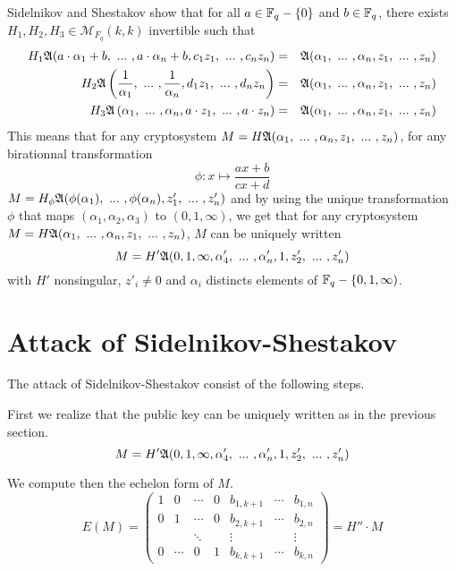 \documentclass[12pt,a4paper,titlepage]{article}
\begin{document}
Sidelnikov and Shestakov show \cite{SidelShes92} that for all $a \in \mathbb{F}_q-\{0\}$ and $b \in \mathbb{F}_q$, there exists $H_1, H_2, H_3 \in \mathcal{M}_{F_q}(k,k)$ invertible such that
\begin{eqnarray*}
H_1 \A(a\cdot\alpha_1 + b, \ ... \ , a\cdot \alpha_n + b, c_1z_1, \ ... \ , c_n z_n) &=& \A(\alpha_1, \ ... \ , \alpha_n, z_1, \ ... \ , z_n) \\
H_2 \A\left( \frac{1}{\alpha_1}, \ ... \ , \frac{1}{\alpha_n}, d_1z_1, \ ... \ , d_n z_n \right) &=& \A(\alpha_1, \ ... \ , \alpha_n, z_1, \ ... \ , z_n) \\
H_3 \A\left( \alpha_1, \ ... \ , \alpha_n, a\cdot z_1, \ ... \ , a\cdot z_n \right) &=& \A(\alpha_1, \ ... \ , \alpha_n, z_1, \ ... \ , z_n)
\end{eqnarray*}
This means that for any cryptosystem $M = H \A(\alpha_1, \ ... \ , \alpha_n, z_1, \ ... \ , z_n)$, for any birationnal transformation
$$ \phi : x \mapsto \frac{ax+b}{cx+d} $$
$M = H_{\phi} \frak{A}(\phi(\alpha_1), \ ... \ , \phi(\alpha_n), z'_1, \ ... \ , z'_n)$ and by using the unique transformation $\phi$ that maps $(\alpha_1, \alpha_2, \alpha_3)$ to $(0,1,\infty)$, we get that for any cryptosystem $M = H \A(\alpha_1, \ ... \ , \alpha_n, z_1, \ ... \ , z_n)$, $M$ can be uniquely written
$$ M = H' \frak{A}(0, 1, \infty, \alpha'_4, \ ... \ , \alpha'_n, 1, z'_2, \ ... \ , z'_n) $$
with $H'$ nonsingular, $z'_i \neq 0$ and $\alpha_i$ distincts elements of $\mathbb{F}_q-\{0, 1, \infty)$.

\section{Attack of Sidelnikov-Shestakov}

The attack of Sidelnikov-Shestakov consist of the following steps.

First we realize that the public key can be uniquely written as in the previous section.
$$ M = H' \frak{A}(0, 1, \infty, \alpha'_4, \ ... \ , \alpha'_n, 1, z'_2, \ ... \ , z'_n) $$

We compute then the echelon form of $M$.
$$ E(M) = 
\left(
\begin{array}{ccccccc}
1 & 0 & \cdots & 0 & b_{1,k+1} & \cdots & b_{1,n} \\
0 & 1 & \cdots & 0 & b_{2,k+1} & \cdots & b_{2,n} \\
  &   & \ddots &   & \vdots &   & \vdots \\
0 & \cdots & 0 & 1 & b_{k,k+1} & \cdots & b_{k,n}
\end{array}
\right) = H'' \cdot M
$$
\end{document}
